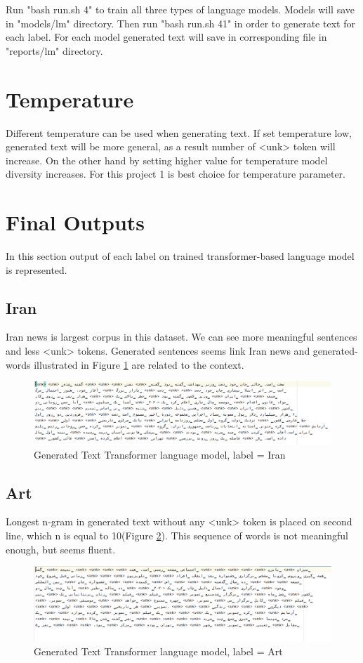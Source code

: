 Run "bash run.sh 4" to train all three types of language models. Models will save in "models/lm" directory. Then run "bash run.sh 41" in order to generate text for each label. For each model generated text will save in corresponding file in "reports/lm" directory.

\section{Temperature}
Different temperature can be used when generating text. If set temperature low, generated text will be more general, as a result number of <unk> token will increase. On the other hand by setting higher value for temperature model diversity increases. For this project 1 is best choice for temperature parameter.
    
\section{Final Outputs} 
In this section output of each label on trained transformer-based language model is represented. 
\subsection{Iran}
Iran news is largest corpus in this dataset. We can see more meaningful sentences and less <unk> tokens. Generated sentences seems link Iran news and generated-words illustrated in Figure \ref{fig:iran} are related to the context. 
\begin{figure}
	\centering
	\includegraphics[width=15cm]{images/iran.png}
	\caption{Generated Text Transformer language model, label = Iran}
	\label{fig:iran}
\end{figure}

\subsection{Art}
Longest n-gram in generated text without any <unk> token is placed on second line, which n is equal to 10(Figure \ref{fig:art}). This sequence of words is not meaningful enough, but seems fluent. 
\begin{figure}
	\centering
	\includegraphics[width=15cm]{images/art.png}
	\caption{Generated Text Transformer language model, label = Art}
	\label{fig:art}
\end{figure}
